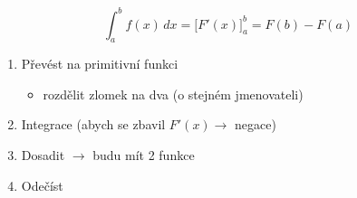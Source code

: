 \begin{equation}
\int_{a}^{b}f(x)\,dx = \Bigr[ F'(x) \Bigr]_a^b=F(b)-F(a)
\end{equation}

\begin{enumerate}
  \item Převést na primitivní funkci
    \begin{itemize}
      \item rozdělit zlomek na dva (o stejném jmenovateli)
    \end{itemize}
  \item Integrace (abych se zbavil $F'(x)\rightarrow$ negace)
  \item Dosadit $\rightarrow$ budu mít 2 funkce
  \item Odečíst
\end{enumerate}

